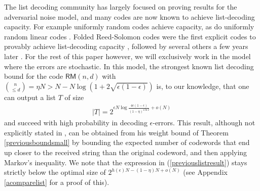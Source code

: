 \documentclass[12pt]{article}
\begin{document}
The list decoding community has largely focused on proving results for the adversarial noise model, and many codes are now known to achieve list-decoding capacity. For example uniformly random codes achieve capacity, as do uniformly random linear codes \cite{guruswami2002listlinear1,Li2018listlinear2,Guruswami2011listlinear3}. Folded Reed-Solomon codes were the first explicit codes to provably achieve list-decoding capacity \cite{Guruswami2008explicitlist}, followed by several others a few years later \cite{Guruswami2012explicitlist2,Kopparty2015explicitlist3,Hemenway2017explicitlist4,Mosheiff2020explicitlist5}. 
For the rest of this paper however, we will exclusively work in the model where the errors are stochastic. 
In this model, the strongest known list decoding bound for the code $\mathsf{RM}(n,d)$ with $\binom{n}{\leq d}=\eta N>N-N\log(1+2\sqrt{\epsilon(1-\epsilon)})$ is, to our knowledge, that one can output a list $T$ of size
\begin{align}\label{previouslistresult}
    |T|=2^{\epsilon N\log\frac{4\epsilon(1-\epsilon)}{(1-\eta)^{4\ln2}}+o(N)}
\end{align}
and succeed with high probability in decoding $\epsilon$-errors. This result, although not
explicitly stated in \cite{samorodnitsky2020weightboundhalf}, can be obtained from his weight bound of Theorem \ref{previousboundsmall} by bounding the
expected number of codewords that end up closer to the received string than the original codeword, and then applying Markov’s inequality. We note that the expression in (\ref{previouslistresult}) stays strictly below the optimal size of $2^{h(\epsilon)N-(1-\eta)N+o(N)}$ (see Appendix \ref{acomparelist} for a proof of this).
\end{document}
